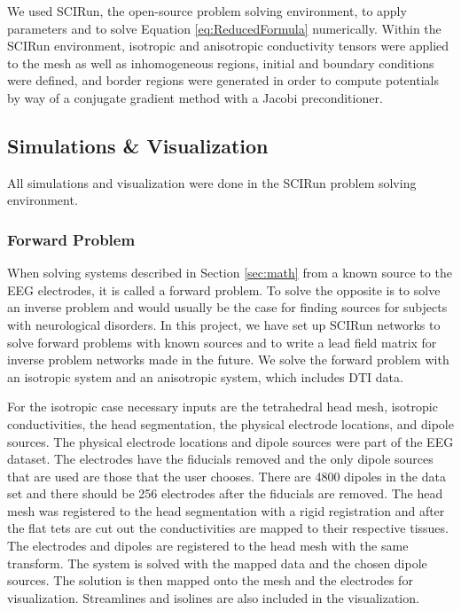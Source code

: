 We used SCIRun, the open-source problem solving environment, to apply parameters and to solve Equation  \ref{eq:ReducedFormula} numerically.  Within the SCIRun environment, isotropic and anisotropic conductivity tensors were applied to the mesh as well as inhomogeneous regions, initial and boundary conditions were defined, and border regions were generated in order to compute potentials by way of a conjugate gradient method with a Jacobi preconditioner.

\subsection{Simulations \& Visualization}
\label{sec:sim}

All simulations and visualization were done in the SCIRun problem solving environment.

\subsubsection{Forward Problem}

When solving systems described in Section \ref {sec:math} from a known source to the EEG electrodes, it is called a forward problem. To solve the opposite is to solve an inverse problem and would usually be the case for finding sources for subjects with neurological disorders. In this project, we have set up SCIRun networks to solve forward problems with known sources and to write a lead field matrix for inverse problem networks made in the future. We solve the forward problem with an isotropic system and an anisotropic system, which includes DTI data. 

For the isotropic case necessary inputs are the tetrahedral head mesh, isotropic conductivities, the head segmentation, the physical electrode locations, and dipole sources. The physical electrode locations and dipole sources were part of the EEG dataset. The electrodes have the fiducials removed and the only dipole sources that are used are those that the user chooses. There are 4800 dipoles in the data set and there should be 256 electrodes after the fiducials are removed. The head mesh was registered to the head segmentation with a rigid registration and after the flat tets are cut out the conductivities are mapped to their respective tissues. The electrodes and dipoles are registered to the head mesh with the same transform. The system is solved with the mapped data and the chosen dipole sources. The solution is then mapped onto the mesh and the electrodes for visualization. Streamlines and isolines are also included in the visualization.

